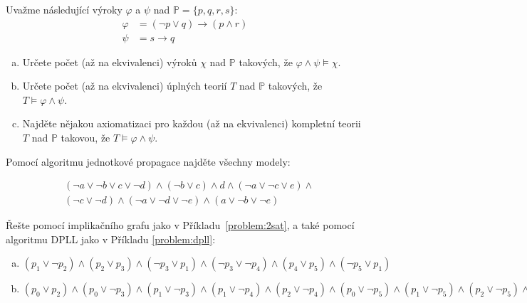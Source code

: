 \begin{problem}

    Uvažme následující výroky $\varphi$ a $\psi$ nad $\mathbb P=\{p, q, r, s\}$:
    \begin{align*}
        \varphi &= (\neg p \vee  q)\to(p\wedge r)\\
        \psi &= s\to q
    \end{align*}
    \begin{enumerate}[(a)]
        \item Určete počet (až na ekvivalenci) výroků $\chi$ nad $\mathbb P$ takových, že $\varphi\wedge\psi\models\chi$.
        \item Určete počet (až na ekvivalenci) úplných teorií $T$ nad $\mathbb P$ takových, že $T\models\varphi\wedge\psi$.
        \item Najděte nějakou axiomatizaci pro každou (až na ekvivalenci) kompletní teorii $T$ nad $\mathbb P$ takovou, že $T\models\varphi\wedge\psi$.
    \end{enumerate}

\end{problem}


\begin{problem} 
    
    Pomocí algoritmu jednotkové propagace najděte všechny modely:

    \begin{align*}
    &(\neg a \vee \neg b \vee c \vee \neg d)\wedge(\neg b \vee c)\wedge d \wedge (\neg a \vee \neg c \vee e)\wedge \\
    &(\neg c \vee \neg d)\wedge(\neg a \vee \neg d \vee \neg e)\wedge(a\vee \neg b \vee\neg e)
    \end{align*}

\end{problem}

    
\begin{problem} 
    
    Řešte pomocí implikačního grafu jako v Příkladu~\ref{problem:2sat}, a také pomocí algoritmu DPLL jako v Příkladu \ref{problem:dpll}:
    \begin{enumerate}[(a)]
        \item $(p_1\vee \neg p_2)\wedge (p_2\vee p_3)\wedge (\neg p_3\vee p_1)\wedge (\neg p_3\vee \neg p_4)\wedge (p_4\vee p_5)\wedge (\neg p_5\vee p_1)$
        \item $(p_0 \vee  p_2) \wedge  (p_0 \vee  \neg p_3) \wedge  (p_1 \vee  \neg p_3) 
        \wedge  (p_1 \vee  \neg p_4) \wedge  (p_2 \vee  \neg p_4) 
        \wedge  (p_0 \vee  \neg p_5)
        \wedge 
        (p_1 \vee  \neg p_5) \wedge  (p_2 \vee  \neg p_5) \wedge  (\neg p_1 \vee  \neg p_6) \wedge  (p_4 \vee  p_6) \wedge  (p_5 \vee  p_6) \wedge  p_1\wedge \neg p_7$
    \end{enumerate}

\end{problem}


